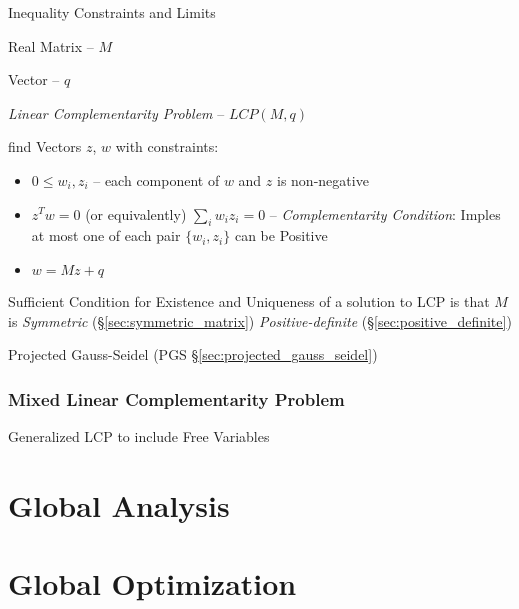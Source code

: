 
Inequality Constraints and Limits %

Real Matrix -- $M$

Vector -- $q$

\emph{Linear Complementarity Problem} -- $LCP(M,q)$

find Vectors $z$, $w$ with constraints:

\begin{itemize}
  \item $0 \leq w_i,z_i$ -- each component of $w$ and $z$ is
    non-negative
  \item $z^T w = 0$ (or equivalently) $\sum_i w_i z_i = 0$ --
    \emph{Complementarity Condition}: Imples at most one of each pair
    $\{w_i,z_i\}$ can be Positive
  \item $w = M z + q$
\end{itemize}

Sufficient Condition for Existence and Uniqueness of a solution to LCP
is that $M$ is \emph{Symmetric} (\S\ref{sec:symmetric_matrix})
\emph{Positive-definite} (\S\ref{sec:positive_definite})

\fist Projected Gauss-Seidel (PGS \S\ref{sec:projected_gauss_seidel})



\subsubsection{Mixed Linear Complementarity Problem}\label{sec:mlcp}

Generalized LCP to include Free Variables



\section{Global Analysis}\label{sec:global_analysis}

\section{Global Optimization}\label{sec:global_optimization}

